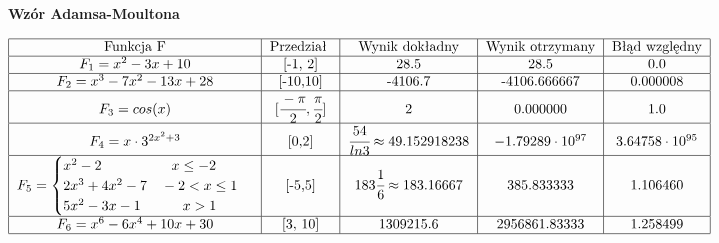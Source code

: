 \documentclass[a4paper]{article}
\begin{document}
\begin{center}
\large
\textbf{Wzór Adamsa-Moultona}

\normalsize
$\begin{tabular}{|c|c|c|c|c|} 
\hline
{Funkcja F} & {Przedział } & {Wynik dokładny} & {Wynik otrzymany} & {Błąd względny} \\ \hline
\begin{math}
F_1 = x^2 - 3x + 10
\end{math} &
[-1, 2] &
28.5 & 28.5 & 0.0 \\ \hline
\begin{math}
F_2 = x^3 - 7x^2 - 13x + 28
\end{math} &
[-10,10] & -4106.7 & -4106.666667 & 0.000008 \\ \hline
\begin{math}
F_3 = cos(x)
\end{math} &
\begin{math}
 [ \cfrac{-\pi}{2} , \cfrac{\pi}{2} ]
\end{math} & 
2 & 0.000000 & 1.0 \\ \hline
\begin{math}
F_4 = x \cdot 3^{2x^2 + 3}
\end{math} &
[0,2] &
\begin{math}
\cfrac{54}{ln 3} \approx 49.152918238
\end{math} &
\begin{math}
-1.79289 \cdot 10^{97}
\end{math} &
\begin{math}
3.64758 \cdot 10^{95} 
\end{math} \\ \hline
\begin{math}
F_5 = \begin{cases}
x^2 - 2 \quad \quad \quad \quad \quad x \leq -2\\
2x^3 + 4x^2 - 7 \quad -2 < x \leq 1\\
5x^2 - 3x - 1 \quad \quad \quad x > 1\\
\end{cases}
\end{math} &
[-5,5] & 
\begin{math}
183\cfrac{1}{6} \approx 183.16667
\end{math} & 
385.833333 & 1.106460 \\ \hline
\begin{math}
F_6 = x^6 - 6x^4 + 10x + 30
\end{math} &
[3, 10] & 1309215.6 & 2956861.83333 & 1.258499 \\ \hline
\end{tabular}$
\end{center}
\end{document}
